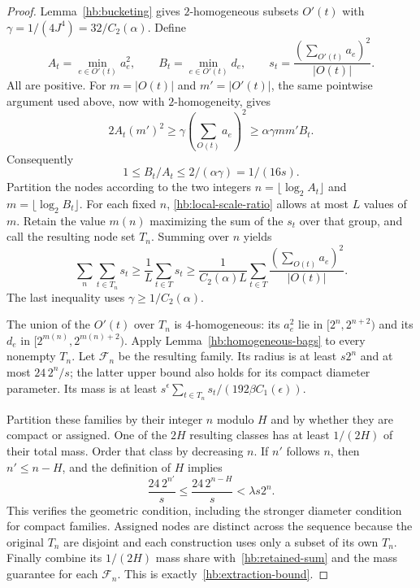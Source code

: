 \documentclass[11pt]{amsart}
\theoremstyle{definition}
\theoremstyle{remark}
\numberwithin{equation}{section}
\begin{document}
\begin{proof}
Lemma~\ref{hb:bucketing} gives $2$-homogeneous subsets $O'(t)$ with
$\gamma=1/(4J^4)=32/C_2(\alpha)$.  Define
\[
 A_t=\min_{e\in O'(t)}a_e^2,
 \qquad B_t=\min_{e\in O'(t)}d_e,
 \qquad s_t=\frac{(\sum_{O'(t)}a_e)^2}{|O(t)|}.
\]
All are positive.  For $m=|O(t)|$ and $m'=|O'(t)|$, the same
pointwise argument used above, now with $2$-homogeneity, gives
\[
 2A_t(m')^2\ge\gamma\left(\sum_{O(t)}a_e\right)^2
 \ge\alpha\gamma mm'B_t.
\]
Consequently
\begin{equation}\label{hb:local-scale-ratio}
 1\le B_t/A_t\le2/(\alpha\gamma)=1/(16s).
\end{equation}
Partition the nodes according to the two integers
$n=\lfloor\log_2 A_t\rfloor$ and
$m=\lfloor\log_2 B_t\rfloor$.  For each fixed $n$,
\eqref{hb:local-scale-ratio} allows at most $L$ values of $m$.
Retain the value $m(n)$ maximizing the sum of the $s_t$ over that group,
and call the resulting node set $T_n$.  Summing over $n$ yields
\begin{equation}\label{hb:retained-sum}
 \sum_n\sum_{t\in T_n}s_t
 \ge\frac1L\sum_{t\in T}s_t
 \ge\frac1{C_2(\alpha)L}
       \sum_{t\in T}\frac{(\sum_{O(t)}a_e)^2}{|O(t)|}.
\end{equation}
The last inequality uses $\gamma\ge1/C_2(\alpha)$.

The union of the $O'(t)$ over $T_n$ is $4$-homogeneous: its $a_e^2$
lie in $[2^n,2^{n+2})$ and its $d_e$ in
$[2^{m(n)},2^{m(n)+2})$.  Apply
Lemma~\ref{hb:homogeneous-bags} to every nonempty $T_n$.
Let $\mathcal F_n$ be the resulting family.  Its radius is at least
$s2^n$ and at most $24\,2^n/s$; the latter upper bound also holds for
its compact diameter parameter.  Its mass is at least
$s^\epsilon\sum_{t\in T_n}s_t/(192\beta C_1(\epsilon))$.

Partition these families by their integer $n$ modulo $H$ and by whether
they are compact or assigned.  One of the $2H$ resulting classes has
at least $1/(2H)$ of their total mass.  Order that class by decreasing
$n$.  If $n'$ follows $n$, then $n'\le n-H$, and the definition of $H$
implies
\[
 \frac{24\,2^{n'}}s
 \le\frac{24\,2^{n-H}}s
 <\lambda s2^n.
\]
This verifies the geometric condition, including the stronger diameter
condition for compact families.  Assigned nodes are distinct across the
sequence because the original $T_n$ are disjoint and each construction
uses only a subset of its own $T_n$.  Finally combine its $1/(2H)$ mass
share with~\eqref{hb:retained-sum} and the mass guarantee for each
$\mathcal F_n$.  This is exactly~\eqref{hb:extraction-bound}.
\end{proof}
\end{document}
